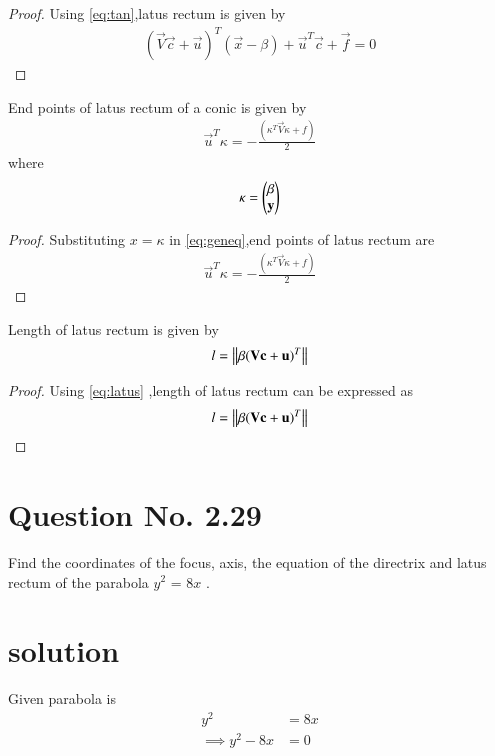\documentclass[journal,12pt,twocolumn]{IEEEtran}
\begin{document}
\begin{proof}
Using \eqref{eq:tan},latus rectum is given by
\begin{align}
(\vec{V}\vec{c}+\vec{u})^T(\vec{x} -\beta) + \vec{u}^T\vec{c} + \vec{f} = 0
\end{align}
\end{proof}

\begin{lemma}
End points of latus rectum of a conic is given by
\begin{align}
\vec{u}^T\kappa = -\frac{(\kappa^T\vec{V}\kappa + f )}{2} \label{eq:endpt}
\end{align}
where
\begin{align}
\kappa = \begin{pmatrix}\beta \\ \mathbf{y}\end{pmatrix}
\end{align}
\end{lemma}

\begin{proof}
Substituting $x=\kappa$ in \eqref{eq:geneq},end points of latus rectum are
\begin{align}
\vec{u}^T\kappa = -\frac{(\kappa^T\vec{V}\kappa + f )}{2}
\end{align}
\end{proof}

\begin{lemma}
Length of latus rectum is given by 
\begin{align}
l=\left\lVert\beta(\mathbf{V}\mathbf{c}+\mathbf{u})^T\right\rVert \label{eq:length}
\end{align}
\end{lemma}

\begin{proof}
Using \eqref{eq:latus} ,length of latus rectum can be expressed as
\begin{align}
  l=\left\lVert\beta(\mathbf{V}\mathbf{c}+\mathbf{u})^T\right\rVert
\end{align}
\end{proof}

\clearpage
\section{Question No. 2.29}
Find the coordinates of the focus, axis, the equation of the directrix and latus rectum of the parabola $y^2$ = 8$x$ .
%
\section{solution}
Given parabola is 
\begin{align}
y^2 &= 8x
\\
\implies y^2 - 8x &= 0
\end{align}
\end{document}
